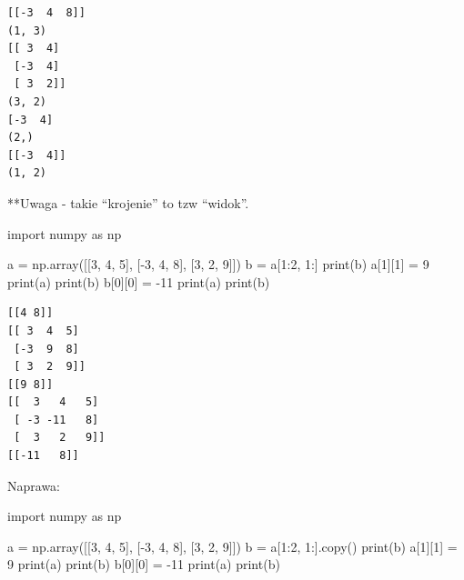 \documentclass[
  polish,
  letterpaper,
  DIV=11,
  numbers=noendperiod]{scrreprt}
\newenvironment{Shaded}{\begin{snugshade}}{\end{snugshade}}
\newcommand{\BuiltInTok}[1]{\textcolor[rgb]{0.00,0.23,0.31}{#1}}
\newcommand{\DecValTok}[1]{\textcolor[rgb]{0.68,0.00,0.00}{#1}}
\newcommand{\ImportTok}[1]{\textcolor[rgb]{0.00,0.46,0.62}{#1}}
\newcommand{\NormalTok}[1]{\textcolor[rgb]{0.00,0.23,0.31}{#1}}
\newcommand{\OperatorTok}[1]{\textcolor[rgb]{0.37,0.37,0.37}{#1}}
\begin{document}
\begin{verbatim}
[[-3  4  8]]
(1, 3)
[[ 3  4]
 [-3  4]
 [ 3  2]]
(3, 2)
[-3  4]
(2,)
[[-3  4]]
(1, 2)
\end{verbatim}

**Uwaga - takie ``krojenie'' to tzw ``widok''.

\begin{Shaded}
\begin{Highlighting}[]
\ImportTok{import}\NormalTok{ numpy }\ImportTok{as}\NormalTok{ np}

\NormalTok{a }\OperatorTok{=}\NormalTok{ np.array([[}\DecValTok{3}\NormalTok{, }\DecValTok{4}\NormalTok{, }\DecValTok{5}\NormalTok{], [}\OperatorTok{{-}}\DecValTok{3}\NormalTok{, }\DecValTok{4}\NormalTok{, }\DecValTok{8}\NormalTok{], [}\DecValTok{3}\NormalTok{, }\DecValTok{2}\NormalTok{, }\DecValTok{9}\NormalTok{]])}
\NormalTok{b }\OperatorTok{=}\NormalTok{ a[}\DecValTok{1}\NormalTok{:}\DecValTok{2}\NormalTok{, }\DecValTok{1}\NormalTok{:]}
\BuiltInTok{print}\NormalTok{(b)}
\NormalTok{a[}\DecValTok{1}\NormalTok{][}\DecValTok{1}\NormalTok{] }\OperatorTok{=} \DecValTok{9}
\BuiltInTok{print}\NormalTok{(a)}
\BuiltInTok{print}\NormalTok{(b)}
\NormalTok{b[}\DecValTok{0}\NormalTok{][}\DecValTok{0}\NormalTok{] }\OperatorTok{=} \OperatorTok{{-}}\DecValTok{11}
\BuiltInTok{print}\NormalTok{(a)}
\BuiltInTok{print}\NormalTok{(b)}
\end{Highlighting}
\end{Shaded}

\begin{verbatim}
[[4 8]]
[[ 3  4  5]
 [-3  9  8]
 [ 3  2  9]]
[[9 8]]
[[  3   4   5]
 [ -3 -11   8]
 [  3   2   9]]
[[-11   8]]
\end{verbatim}

Naprawa:

\begin{Shaded}
\begin{Highlighting}[]
\ImportTok{import}\NormalTok{ numpy }\ImportTok{as}\NormalTok{ np}

\NormalTok{a }\OperatorTok{=}\NormalTok{ np.array([[}\DecValTok{3}\NormalTok{, }\DecValTok{4}\NormalTok{, }\DecValTok{5}\NormalTok{], [}\OperatorTok{{-}}\DecValTok{3}\NormalTok{, }\DecValTok{4}\NormalTok{, }\DecValTok{8}\NormalTok{], [}\DecValTok{3}\NormalTok{, }\DecValTok{2}\NormalTok{, }\DecValTok{9}\NormalTok{]])}
\NormalTok{b }\OperatorTok{=}\NormalTok{ a[}\DecValTok{1}\NormalTok{:}\DecValTok{2}\NormalTok{, }\DecValTok{1}\NormalTok{:].copy()}
\BuiltInTok{print}\NormalTok{(b)}
\NormalTok{a[}\DecValTok{1}\NormalTok{][}\DecValTok{1}\NormalTok{] }\OperatorTok{=} \DecValTok{9}
\BuiltInTok{print}\NormalTok{(a)}
\BuiltInTok{print}\NormalTok{(b)}
\NormalTok{b[}\DecValTok{0}\NormalTok{][}\DecValTok{0}\NormalTok{] }\OperatorTok{=} \OperatorTok{{-}}\DecValTok{11}
\BuiltInTok{print}\NormalTok{(a)}
\BuiltInTok{print}\NormalTok{(b)}
\end{Highlighting}
\end{Shaded}
\end{document}
